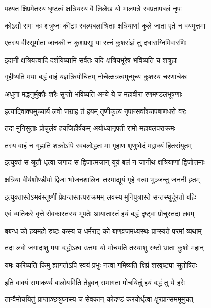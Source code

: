 \twolineshloka
{पश्यत क्षिप्रमेतस्य धृष्टत्वं क्षत्रियस्य वै}
{लिलेख यो भालपत्रे स्वप्रतापबलं नृपः}%

\twolineshloka
{कोऽसौ रामः कः शत्रुघ्नः कीटाः स्वल्पबलाश्रिताः}
{क्षत्रियाणां कुले जाता एते न वयमुत्तमाः}%

\twolineshloka
{एतस्य वीरसूर्माता जानकी न कुशप्रसूः}
{या रत्नं कुशसंज्ञं तु दधाराग्निमिवारणिः}%

\twolineshloka
{इदानीं क्षत्रियत्वादि दर्शयिष्यामि सर्वतः}
{यदि क्षत्रियभूरेष भविष्यति च शत्रुहा}%

\twolineshloka
{गृहीष्यति मया बद्धं वाहं यज्ञक्रियोचितम्}
{नोचेत्क्षत्रत्वमुन्मुच्य कुशस्य चरणार्चकः}%

\twolineshloka
{अधुना मद्धनुर्मुक्तैः शरैः सुप्तो भविष्यति}
{अन्ये ये च महावीरा रणमण्डलभूषणाः}%

\twolineshloka
{इत्यादिवाक्यमुच्चार्य लवो जग्राह तं हयम्}
{तृणीकृत्य नृपान्सर्वांश्चापबाणधरो वरः}%

\twolineshloka
{तदा मुनिसुताः प्रोचुर्लवं हयजिहीर्षकम्}
{अयोध्यानृपती रामो महाबलपराक्रमः}%

\twolineshloka
{तस्य वाहं न गृह्णाति शक्रोऽपि स्वबलोद्धतः}
{मा गृहाण शृणुष्वेदं मद्वाक्यं हितसंयुतम्}%

\twolineshloka
{इत्युक्तं स श्रुतौ धृत्वा जगाद स द्विजात्मजान्}
{यूयं बलं न जानीथ क्षत्रियाणां द्विजोत्तमाः}%

\twolineshloka
{क्षत्रिया वीर्यशौण्डीर्या द्विजा भोजनशालिनः}
{तस्माद्यूयं गृहे गत्वा भुञ्जन्तु जननी हृतम्}%

\twolineshloka
{इत्युक्तास्तेऽभवंस्तूष्णीं प्रेक्षन्तस्तत्पराक्रमम्}
{लवस्य मुनिपुत्रास्ते सन्तस्थुर्दूरतो बहिः}%

\twolineshloka
{एवं व्यतिकरे वृत्ते सेवकास्तस्य भूपतेः}
{आयातास्तं हयं बद्धं दृष्ट्वा प्रोचुस्तदा लवम्}%

\twolineshloka
{बबन्ध को हयमहो रुष्टः कस्य च धर्मराट्}
{को बाणव्रजमध्यस्थः प्राप्स्यते परमां व्यथाम्}%

\twolineshloka
{तदा लवो जगादाशु मया बद्धोऽश्व उत्तमः}
{यो मोचयति तस्याशु रुष्टो भ्राता कुशो महान्}%

\twolineshloka
{यमः करिष्यति किमु ह्यागतोऽपि स्वयं प्रभुः}
{नत्वा गमिष्यति क्षिप्रं शरवृष्ट्या सुतोषितः}%


\twolineshloka
{इति वाक्यं समाकर्ण्य बालोयमिति तेब्रुवन्}
{समागता मोचयितुं हयं बद्धं तु ये हरेः}%

\twolineshloka
{तान्वैमोचयितुं प्राप्ताञ्छत्रुघ्नस्य च सेवकान्}
{कोदण्डं करयोर्धृत्वा क्षुरप्रान्सममूमुचत्}%


